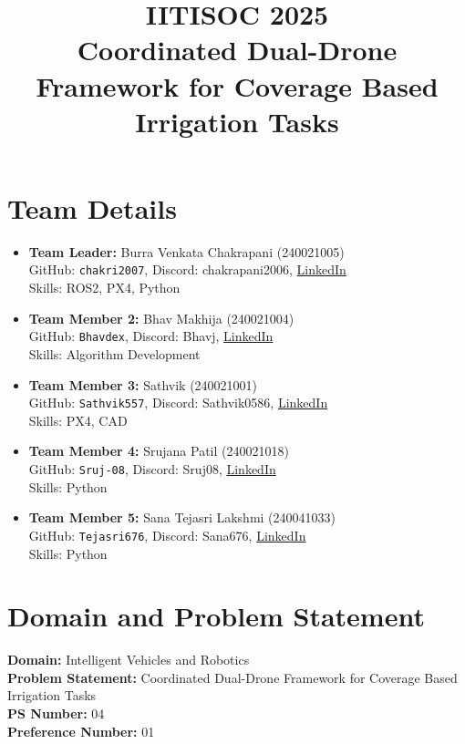 \documentclass[12pt]{article}
\title{IITISOC 2025\\\large Coordinated Dual-Drone Framework for Coverage Based Irrigation Tasks}
\author{}
\date{}
\begin{document}
\maketitle

\section*{Team Details}
\begin{itemize}[leftmargin=*]
  \item \textbf{Team Leader:} Burra Venkata Chakrapani (240021005)\\
  GitHub: \texttt{chakri2007}, Discord: chakrapani2006, \href{https://www.linkedin.com/in/chakrapani-burra-086878352}{LinkedIn}\\
  Skills: ROS2, PX4, Python
  \item \textbf{Team Member 2:} Bhav Makhija (240021004)\\
  GitHub: \texttt{Bhavdex}, Discord: Bhavj, \href{https://www.linkedin.com/in/bhav-makhija}{LinkedIn}\\
  Skills: Algorithm Development
  \item \textbf{Team Member 3:} Sathvik (240021001)\\
  GitHub: \texttt{Sathvik557}, Discord: Sathvik0586, \href{https://www.linkedin.com/in/amadala-sathvik-333b7a323}{LinkedIn}\\
  Skills: PX4, CAD
  \item \textbf{Team Member 4:} Srujana Patil (240021018)\\
  GitHub: \texttt{Sruj-08}, Discord: Sruj08, \href{https://www.linkedin.com/in/srujana-patil-620677324}{LinkedIn}\\
  Skills: Python
  \item \textbf{Team Member 5:} Sana Tejasri Lakshmi (240041033)\\
  GitHub: \texttt{Tejasri676}, Discord: Sana676, \href{https://www.linkedin.com/in/tejasri-lakshmi-sana-b6951b321}{LinkedIn}\\
  Skills: Python
\end{itemize}

\section*{Domain and Problem Statement}
\textbf{Domain:} Intelligent Vehicles and Robotics\\
\textbf{Problem Statement:} Coordinated Dual-Drone Framework for Coverage Based Irrigation Tasks\\
\textbf{PS Number:} 04 \\
\textbf{Preference Number:} 01
\end{document}
